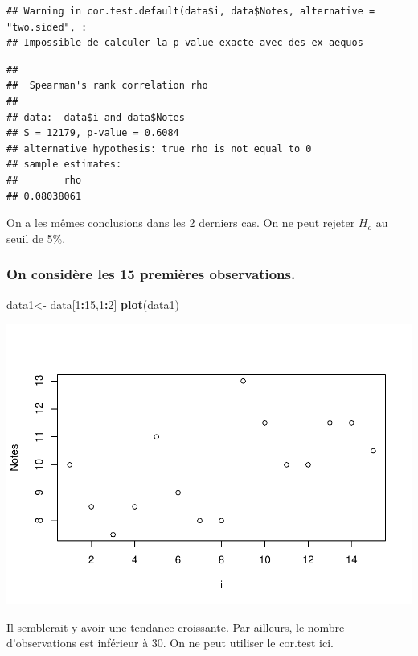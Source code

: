 \documentclass[
  12pt,
]{article}
\newenvironment{Shaded}{\begin{snugshade}}{\end{snugshade}}
\newcommand{\DecValTok}[1]{\textcolor[rgb]{0.00,0.00,0.81}{#1}}
\newcommand{\FunctionTok}[1]{\textcolor[rgb]{0.13,0.29,0.53}{\textbf{#1}}}
\newcommand{\NormalTok}[1]{#1}
\newcommand{\OtherTok}[1]{\textcolor[rgb]{0.56,0.35,0.01}{#1}}
\newcommand{\SpecialCharTok}[1]{\textcolor[rgb]{0.81,0.36,0.00}{\textbf{#1}}}
\begin{document}
\begin{verbatim}
## Warning in cor.test.default(data$i, data$Notes, alternative = "two.sided", :
## Impossible de calculer la p-value exacte avec des ex-aequos
\end{verbatim}

\begin{verbatim}
## 
##  Spearman's rank correlation rho
## 
## data:  data$i and data$Notes
## S = 12179, p-value = 0.6084
## alternative hypothesis: true rho is not equal to 0
## sample estimates:
##        rho 
## 0.08038061
\end{verbatim}

On a les mêmes conclusions dans les 2 derniers cas. On ne peut rejeter
\(H_o\) au seuil de 5\%.

\subsubsection{On considère les 15 premières
observations.}\label{on-considuxe8re-les-15-premiuxe8res-observations.}

\begin{Shaded}
\begin{Highlighting}[]
\NormalTok{data1}\OtherTok{\textless{}{-}}\NormalTok{ data[}\DecValTok{1}\SpecialCharTok{:}\DecValTok{15}\NormalTok{,}\DecValTok{1}\SpecialCharTok{:}\DecValTok{2}\NormalTok{] }
\FunctionTok{plot}\NormalTok{(data1)}
\end{Highlighting}
\end{Shaded}

\includegraphics{Stat_non_para_files/figure-latex/unnamed-chunk-19-1.pdf}

Il semblerait y avoir une tendance croissante. Par ailleurs, le nombre
d'observations est inférieur à 30. On ne peut utiliser le cor.test ici.
\end{document}
